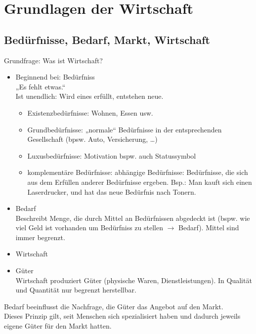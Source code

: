 \chapter{Grundlagen der Wirtschaft}
\section{Bedürfnisse, Bedarf, Markt, Wirtschaft}
Grundfrage: Was ist Wirtschaft?
\begin{itemize}
\item Beginnend bei: Bedürfniss\\
„Es fehlt etwas.“\\
Ist unendlich: Wird eines erfüllt, entstehen neue.
\begin{itemize}
\item Existenzbedürfnisse: Wohnen, Essen usw.
\item Grundbedürfnisse: „normale“ Bedürfnisse in der entsprechenden Gesellschaft (bpsw. Auto, Versicherung, …)
\item Luxusbedürfnisse: Motivation bspw. auch Statussymbol
\item komplementäre Bedürfnisse: abhängige Bedürfnisse: Bedürfnisse, die sich aus dem Erfüllen anderer Bedürfnisse ergeben. Bsp.: Man kauft sich einen Laserdrucker, und hat das neue Bedürfnis nach Tonern.
\end{itemize}
\item Bedarf\\
Beschreibt Menge, die durch Mittel an Bedürfnissen abgedeckt ist (bspw. wie viel Geld ist vorhanden um Bedürfniss zu stellen $\rightarrow$ Bedarf). Mittel sind immer begrenzt.
\item Wirtschaft
\item Güter\\
Wirtschaft produziert Güter (physische Waren, Dienstleistungen). In Qualität und Quantität nur begrenzt herstellbar.
\end{itemize}
Bedarf beeinflusst die Nachfrage, die Güter das Angebot auf den Markt.\\
Dieses Prinzip gilt, seit Menschen sich spezialisiert haben und dadurch jeweils eigene Güter für den Markt hatten.

